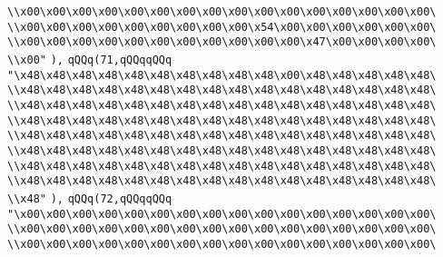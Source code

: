 \verb|\\x00\x00\x00\x00\x00\x00\x00\x00\x00\x00\x00\x00\x00\x00\x00\x00\|\newline
\verb|\\x00\x00\x00\x00\x00\x00\x00\x00\x00\x54\x00\x00\x00\x00\x00\x00\|\newline
\verb|\\x00\x00\x00\x00\x00\x00\x00\x00\x00\x00\x00\x47\x00\x00\x00\x00\|\newline
\verb|\\x00"|\newline
\verb|),|\newline
\verb|qQQq(71,qQQqqQQq|\newline
\verb|"\x48\x48\x48\x48\x48\x48\x48\x48\x48\x48\x00\x48\x48\x48\x48\x48\|\newline
\verb|\\x48\x48\x48\x48\x48\x48\x48\x48\x48\x48\x48\x48\x48\x48\x48\x48\|\newline
\verb|\\x48\x48\x48\x48\x48\x48\x48\x48\x48\x48\x48\x48\x48\x48\x48\x48\|\newline
\verb|\\x48\x48\x48\x48\x48\x48\x48\x48\x48\x48\x48\x48\x48\x48\x48\x48\|\newline
\verb|\\x48\x48\x48\x48\x48\x48\x48\x48\x48\x48\x48\x48\x48\x48\x48\x48\|\newline
\verb|\\x48\x48\x48\x48\x48\x48\x48\x48\x48\x48\x48\x48\x48\x48\x48\x48\|\newline
\verb|\\x48\x48\x48\x48\x48\x48\x48\x48\x48\x48\x48\x48\x48\x48\x48\x48\|\newline
\verb|\\x48\x48\x48\x48\x48\x48\x48\x48\x48\x48\x48\x48\x48\x48\x48\x48\|\newline
\verb|\\x48"|\newline
\verb|),|\newline
\verb|qQQq(72,qQQqqQQq|\newline
\verb|"\x00\x00\x00\x00\x00\x00\x00\x00\x00\x00\x00\x00\x00\x00\x00\x00\|\newline
\verb|\\x00\x00\x00\x00\x00\x00\x00\x00\x00\x00\x00\x00\x00\x00\x00\x00\|\newline
\verb|\\x00\x00\x00\x00\x00\x00\x00\x00\x00\x00\x00\x00\x00\x00\x00\x00\|\newline
